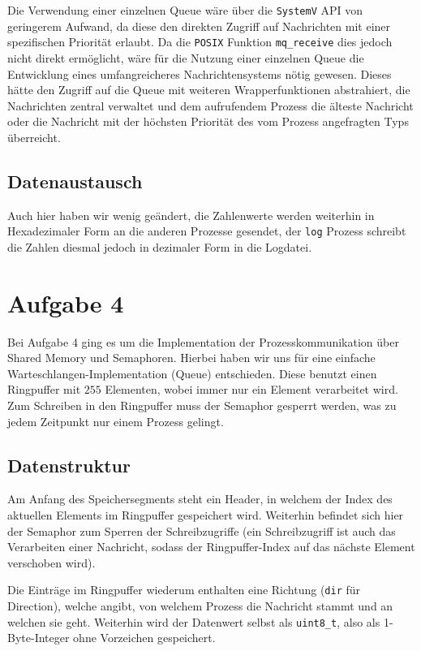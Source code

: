 \documentclass[12pt, a4paper]{scrartcl}
\begin{document}
Die Verwendung einer einzelnen Queue wäre über die \texttt{SystemV} API von 
geringerem Aufwand, da diese den direkten Zugriff auf Nachrichten mit einer
spezifischen Priorität erlaubt. Da die \texttt{POSIX} Funktion
\texttt{mq\_receive} dies jedoch nicht direkt ermöglicht, wäre für die Nutzung
einer einzelnen Queue die Entwicklung eines umfangreicheres Nachrichtensystems
nötig gewesen. Dieses hätte den Zugriff auf die Queue mit weiteren
Wrapperfunktionen abstrahiert, die Nachrichten zentral verwaltet und dem
aufrufendem Prozess die älteste Nachricht oder die Nachricht mit der höchsten
Priorität des vom Prozess angefragten Typs überreicht.

\subsection{Datenaustausch}
Auch hier haben wir wenig geändert, die Zahlenwerte werden weiterhin in 
Hexadezimaler Form an die anderen Prozesse gesendet, der \texttt{log} 
Prozess schreibt die Zahlen diesmal jedoch in dezimaler Form in die Logdatei.

\clearpage
\section{Aufgabe 4}

Bei Aufgabe 4 ging es um die Implementation der Prozesskommunikation über
Shared Memory und Semaphoren. Hierbei haben wir uns für eine einfache
Warteschlangen-Implementation (Queue) entschieden. Diese benutzt einen
Ringpuffer mit $255$ Elementen, wobei immer nur ein Element verarbeitet
wird. Zum Schreiben in den Ringpuffer muss der Semaphor gesperrt werden, was zu
jedem Zeitpunkt nur einem Prozess gelingt.

\subsection{Datenstruktur}

Am Anfang des Speichersegments steht ein Header, in welchem der Index des
aktuellen Elements im Ringpuffer gespeichert wird. Weiterhin befindet sich hier
der Semaphor zum Sperren der Schreibzugriffe (ein Schreibzugriff ist auch das
Verarbeiten einer Nachricht, sodass der Ringpuffer-Index auf das nächste
Element verschoben wird).
\np

Die Einträge im Ringpuffer wiederum enthalten eine Richtung (\texttt{dir} für
Direction), welche angibt, von welchem Prozess die Nachricht stammt und an
welchen sie geht. Weiterhin wird der Datenwert selbst als \texttt{uint8\_t},
also als 1-Byte-Integer ohne Vorzeichen gespeichert.
\end{document}
